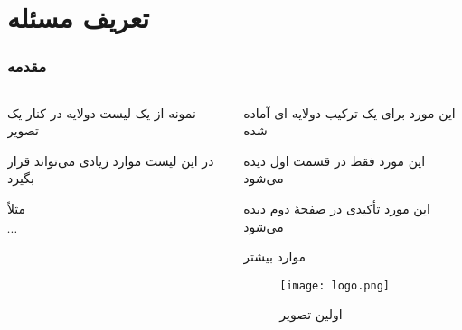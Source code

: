 \documentclass[xcolor=dvipsnames, professionalfonts, aspectratio=169, 11pt]{beamer}
\begin{document}
\section{تعریف مسئله}
\begin{frame}
    \frametitle{مقدمه}

    \begin{columns}[onlytextwidth]
        \begin{column}{.4\textwidth}
            \begin{moredi}
                \item نمونه از یک لیست دولایه در کنار یک تصویر
                \begin{moredi}[<1>]
                    \item در این لیست موارد زیادی می‌تواند قرار بگیرد
                    \item مثلاً
                    \item $\cdots$

                \end{moredi}
            \end{moredi}
        \end{column}
        \begin{column}{.6\textwidth}
            \begin{moredi}
                \item این مورد برای یک ترکیب دولایه ای آماده شده
                \begin{moredi}
                    \item<1> این مورد فقط در قسمت اول دیده می‌شود
                    \item \alert<2>{این مورد تأکیدی در صفحهٔ دوم دیده می‌شود}
                    \item<1> موارد بیشتر

                \end{moredi}
            \end{moredi}
            \begin{figure}
                \vspace{-1em}
                \texttt{[image: logo.png]}
                \caption{اولین تصویر }
            \end{figure}
        \end{column}
    \end{columns}

\end{frame}
\end{document}
